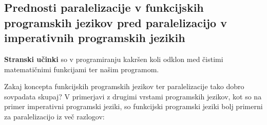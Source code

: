 \documentclass[mat1, tisk]{fmfdelo}
\begin{document}

\subsection{Prednosti paralelizacije v funkcijskih programskih jezikov pred paralelizacijo v imperativnih programskih jezikih}

\begin{definicija}
  \textbf{Stranski učinki} so v programiranju kakršen koli odklon med čistimi matematičnimi funkcijami ter našim programom.
\end{definicija}

Zakaj koncepta funkcijskih programskih jezikov ter paralelizacije tako dobro sovpadata skupaj?
V primerjavi z drugimi vrstami programskih jezikov, kot so na primer imperativni programski jeziki,
so funkcijski programski jeziki bolj primerni za paralelizacijo iz več razlogov:
\end{document}
